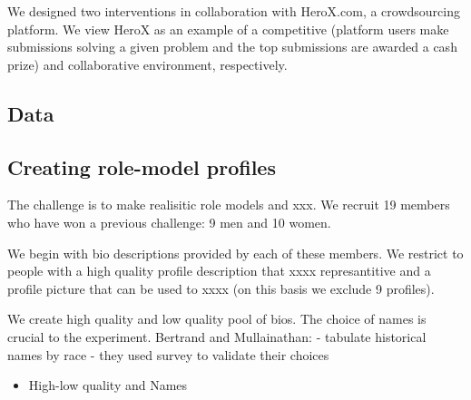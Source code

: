 \documentclass[12pt, titlepage]{article}
\providecommand{\tightlist}{%
  \setlength{\itemsep}{0pt}\setlength{\parskip}{0pt}}
\begin{document}
We designed two interventions in collaboration with HeroX.com, a
crowdsourcing platform. We view HeroX as an example of a competitive
(platform users make submissions solving a given problem and the top
submissions are awarded a cash prize) and collaborative environment,
respectively.

\subsection{Data}\label{data}

\subsection{Creating role-model
profiles}\label{creating-role-model-profiles}

The challenge is to make realisitic role models and xxx. We recruit 19
members who have won a previous challenge: 9 men and 10 women.

We begin with bio descriptions provided by each of these members. We
restrict to people with a high quality profile description that xxxx
represantitive and a profile picture that can be used to xxxx (on this
basis we exclude 9 profiles).

We create high quality and low quality pool of bios. The choice of names
is crucial to the experiment. Bertrand and Mullainathan: - tabulate
historical names by race - they used survey to validate their choices

\begin{itemize}
\tightlist
\item
  High-low quality and Names
\end{itemize}

\renewcommand\refname{References}

\end{document}
